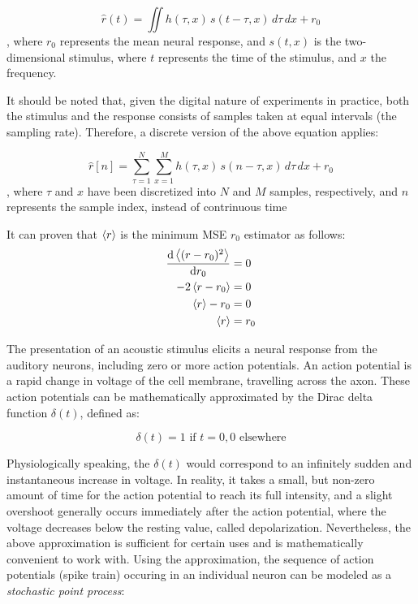 \begin{equation}\label{impulse response}
	\hat{r}(t) = \iint h(\tau, x)\, s(t - \tau, x)\, d\tau\, dx + r_0
\end{equation}
\noindent , where $r_0$ represents the mean neural response, and $s(t, x)$ is the two-dimensional stimulus, where $t$ represents the time of the stimulus, and $x$ the frequency.

It should be noted that, given the digital nature of experiments in practice, both the stimulus and the response consists of samples taken at equal intervals (the sampling rate). Therefore, a discrete version of the above equation applies:

\begin{equation}
\hat{r}[n] = \sum_{\tau=1}^N \sum_{x=1}^M h(\tau, x)\, s(n - \tau, x)\, d\tau\, dx + r_0
\end{equation}
, where $\tau$ and $x$ have been discretized into $N$ and $M$ samples, respectively, and $n$ represents the sample index, instead of contrinuous time

It can proven that $\left\langle r \right\rangle$ is the minimum MSE $r_0$ estimator as follows:
\begin{align*}
	\dv{\left\langle (r - r_0)^2 \right\rangle}{r_0} &= 0 \\
	-2\left\langle r-r_0 \right\rangle &= 0 \\
	\left\langle r \right\rangle - r_0 &= 0 \\
	\left\langle r \right\rangle &= r_0
\end{align*}

The presentation of an acoustic stimulus elicits a neural response from the auditory neurons, including zero or more action potentials. An action potential is a rapid change in voltage of the cell membrane, travelling across the axon. These action potentials can be mathematically approximated by the Dirac delta function $\delta(t)$, defined as:

\begin{equation}
	\delta(t) = 1 \textrm{ if } t=0, 0 \textrm{ elsewhere} 
\end{equation}

Physiologically speaking, the $\delta(t)$ would correspond to an infinitely sudden and instantaneous increase in voltage. In reality, it takes a small, but non-zero amount of time for the action potential to reach its full intensity, and a slight overshoot generally occurs immediately after the action potential, where the voltage decreases below the resting value, called depolarization. Nevertheless, the above approximation is sufficient for certain uses and is mathematically convenient to work with. Using the approximation, the sequence of action potentials (spike train) occuring in an individual neuron can be modeled as a \emph{stochastic point process}:

